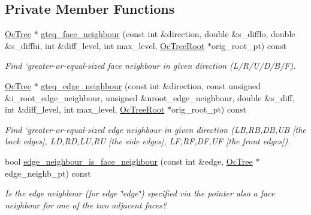 \subsection*{Private Member Functions}
\begin{DoxyCompactItemize}
\item 
\hyperlink{classoomph_1_1OcTree}{Oc\+Tree} $\ast$ \hyperlink{classoomph_1_1OcTree_ad11986ca92b1254b5ea1f4fd2af6f51c}{gteq\+\_\+face\+\_\+neighbour} (const int \&direction, double \&s\+\_\+difflo, double \&s\+\_\+diffhi, int \&diff\+\_\+level, int max\+\_\+level, \hyperlink{classoomph_1_1OcTreeRoot}{Oc\+Tree\+Root} $\ast$orig\+\_\+root\+\_\+pt) const
\begin{DoxyCompactList}\small\item\em Find `greater-\/or-\/equal-\/sized face neighbour\textquotesingle{} in given direction (L/\+R/\+U/\+D/\+B/F). \end{DoxyCompactList}\item 
\hyperlink{classoomph_1_1OcTree}{Oc\+Tree} $\ast$ \hyperlink{classoomph_1_1OcTree_abaa4c8bbf2fdbad7465af2c4964a915f}{gteq\+\_\+edge\+\_\+neighbour} (const int \&direction, const unsigned \&i\+\_\+root\+\_\+edge\+\_\+neighbour, unsigned \&nroot\+\_\+edge\+\_\+neighbour, double \&s\+\_\+diff, int \&diff\+\_\+level, int max\+\_\+level, \hyperlink{classoomph_1_1OcTreeRoot}{Oc\+Tree\+Root} $\ast$orig\+\_\+root\+\_\+pt) const
\begin{DoxyCompactList}\small\item\em Find `greater-\/or-\/equal-\/sized edge neighbour\textquotesingle{} in given direction (LB,RB,DB,UB \mbox{[}the back edges\mbox{]}, LD,RD,LU,RU \mbox{[}the side edges\mbox{]}, LF,RF,DF,UF \mbox{[}the front edges\mbox{]}). \end{DoxyCompactList}\item 
bool \hyperlink{classoomph_1_1OcTree_ab780bf82a61230f23bc3d96774a63010}{edge\+\_\+neighbour\+\_\+is\+\_\+face\+\_\+neighbour} (const int \&edge, \hyperlink{classoomph_1_1OcTree}{Oc\+Tree} $\ast$edge\+\_\+neighb\+\_\+pt) const
\begin{DoxyCompactList}\small\item\em Is the edge neighbour (for edge \char`\"{}edge\char`\"{}) specified via the pointer also a face neighbour for one of the two adjacent faces? \end{DoxyCompactList}\end{DoxyCompactItemize}
